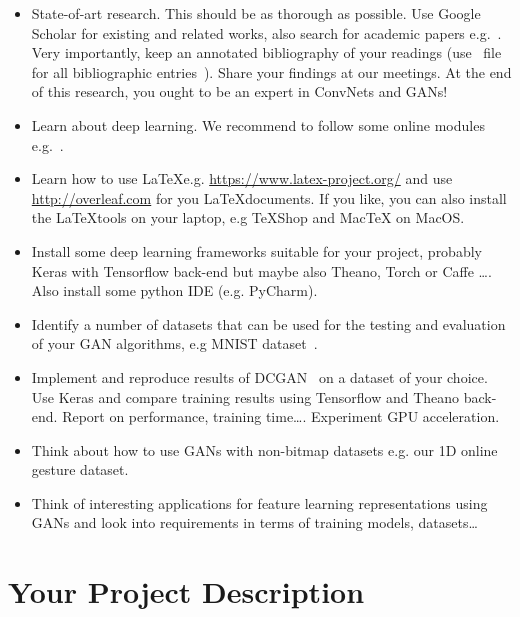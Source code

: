 \documentclass[]{monthly-report}
\begin{document}
\begin{itemize}

\item State-of-art research. This should be as thorough as possible. Use Google Scholar for existing and related works, also search for academic papers e.g.~\cite{goodfellow_GAN_2014, donahue2016bigan, GAN_refs_2016}. Very importantly, keep an annotated bibliography of your readings (use \BibTeX\ file for all bibliographic entries~\cite{BibTeX}). Share your findings at our  meetings. At the end of this research, you ought to be an expert in ConvNets and GANs!

\item Learn about deep learning. We recommend to follow some online modules e.g.~\cite{Ng-Coursera-2016, VincentVanhoucke-Udacity-2016, Nvidia-DL-Course-2016}.

\item Learn how to use \LaTeX e.g. \url{https://www.latex-project.org/} and use \url{http://overleaf.com} for you \LaTeX documents. If you like, you can also install the \LaTeX tools on your laptop, e.g TeXShop and MacTeX on MacOS.

\item Install some deep learning frameworks suitable for your project, probably Keras with Tensorflow back-end but maybe also Theano, Torch or Caffe \ldots. Also install some python IDE (e.g. PyCharm).

\item Identify a number of datasets that can be used for the testing and evaluation of your GAN algorithms, e.g MNIST dataset~\cite{NMIST-dataset}.

\item Implement and reproduce results of DCGAN~\cite{DCGAN2015} on a dataset of your choice. Use Keras and compare training results using Tensorflow and Theano back-end. Report on performance, training time\ldots. Experiment GPU acceleration.

\item Think about how to use GANs with non-bitmap datasets e.g. our 1D online gesture dataset.

\item Think of interesting applications for feature learning representations using GANs and look into requirements in terms of training models, datasets\ldots

\end{itemize}

\section{Your Project Description}
\end{document}
